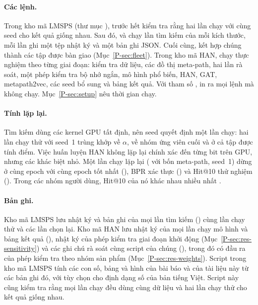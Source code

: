 \paragraph{Các lệnh.} Trong kho mã LMSPS (thư mục ),  trước
hết kiểm tra rằng hai lần chạy với cùng seed cho kết quả giống nhau. Sau đó,
 và  chạy  lần tìm kiếm của mỗi kích
thước, mỗi lần ghi một tệp nhật ký và một bản ghi JSON. Cuối cùng, 
kết hợp
chúng thành các tập được bàn giao (Mục~\ref*{P-sec:fleet}). Trong kho mã HAN,  chạy
thực nghiệm theo từng giai đoạn: kiểm tra dữ liệu, các đồ thị meta-path, hai lần rà soát, một
phép kiểm tra bộ nhớ ngắn, mô hình phổ biến, HAN, GAT, metapath2vec, các seed bổ sung và bảng kết
quả. Với tham số ,  in ra mọi lệnh mà không chạy. Mục~\ref*{P-sec:setup} nêu thời gian chạy.

\paragraph{Tính lặp lại.} Tìm kiếm dùng các kernel GPU tất định, nên seed quyết định một lần chạy:
hai lần chạy thử với seed~1 trùng khớp về $\alpha$, về nhóm ứng viên cuối và ở cả 
tập được tính điểm. Việc huấn luyện HAN không lặp lại chính xác đến từng bit trên GPU, nhưng các
khác biệt nhỏ. Một lần chạy lặp lại ( với bốn meta-path, seed~1) dừng ở cùng epoch với
cùng epoch tốt nhất (), BPR xác thực () và Hit@10 thử
nghiệm (). Trong các nhóm người dùng, Hit@10 của nó khác nhau nhiều nhất
.

\paragraph{Bản ghi.} Kho mã LMSPS lưu nhật ký và bản ghi của mọi lần tìm kiếm
() cùng lần chạy thử và các lần chọn lại. Kho mã HAN lưu nhật ký của mọi
lần chạy mô hình và bảng kết quả (), nhật ký của phép kiểm tra giai đoạn khởi
động (Mục~\ref*{P-sec:res-sensitivity}) và các ghi chú rà soát cùng script của chúng (),
trong đó có đầu ra của phép kiểm tra theo nhóm sản phẩm (Mục~\ref*{P-sec:res-weights}). Script
 trong kho mã LMSPS tính các con số, bảng và hình của bài báo và của tài
liệu này từ các bản ghi đó, với tùy chọn  cho định dạng số của bản tiếng Việt.
Script này cũng kiểm tra rằng mọi lần chạy đều dùng cùng dữ liệu và hai lần chạy thử cho kết quả giống nhau.

